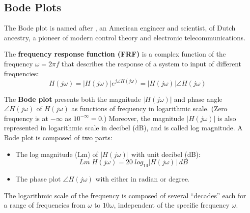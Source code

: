\documentclass{article}
\begin{document}
\subsection*{Bode Plots}

The Bode plot is named after 
, an American engineer and scientist, of Dutch ancestry,
a pioneer of modern control theory and electronic telecommunications. 

The {\bf frequency response function (FRF)} is a complex function of the 
frequency $\omega=2\pi f$ that describes the response of a system to input of
different frequencies:
\begin{equation}
  H(j\omega)=|H(j\omega)|e^{j\angle H(j\omega)}=|H(j\omega)| \angle H(j\omega) 
\end{equation}

The {\bf Bode plot} presents both the magnitude $|H(j\omega)|$ and phase 
angle $\angle H(j\omega)$ of $H(j\omega)$ as functions of frequency in 
logarithmic scale. (Zero frequency is at $-\infty$ as $10^{-\infty}=0$.)
Moreover, the magnitude $| H(j\omega) |$ is also represented in logarithmic
scale in decibel (dB), and is called log magnitude.
A Bode plot is composed of two parts:
\begin{itemize}
\item The log magnitude (Lm) of $|H(j\omega)|$ with unit decibel (dB):
  \begin{equation} 
    Lm\; H(j\omega)=20 \;log_{10} |H(j\omega)|\;dB 
  \end{equation}
\item
  The phase plot $\angle H(j\omega)$ with either in radian or degree.
\end{itemize}
The logarithmic scale of the frequency is composed of several ``decades'' each 
for a range of frequencies from $\omega$ to $10 \omega$, independent of the 
specific frequency $\omega$.
\end{document}
